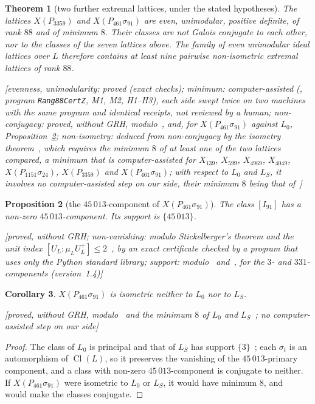 \documentclass[11pt,a4paper]{amsart}
\theoremstyle{plain}
\newtheorem{theorem}{Theorem}[section]
\newtheorem{proposition}[theorem]{Proposition}
\newtheorem{corollary}[theorem]{Corollary}
\theoremstyle{definition}
\DeclareMathOperator{\Cl}{Cl}
\newcommand{\Lz}{L_{0}}
\newcommand{\LS}{L_{S}}
\newcommand{\XA}{X(P_{3359})}
\newcommand{\XB}{X(P_{461}\sigma_{91})}
\newcommand{\XC}{X(P_{1151}\sigma_{24})}
\newcommand{\st}[1]{\textup{\textsf{\small[#1]}}}
\begin{document}
\begin{theorem}[two further extremal lattices, under the stated hypotheses]\label{thm:neuf}
The lattices $\XA$ and $\XB$ are even, unimodular, positive definite, of rank $88$ and of minimum $8$. Their classes are not Galois conjugate to each other, nor to the classes of the seven lattices above. The family of even unimodular ideal lattices over $L$ therefore contains at least nine pairwise non-isometric extremal lattices of rank $88$.

\st{evenness, unimodularity: proved (exact checks); minimum: computer-assisted (\cite[Thm.~4.6]{Gau26}, program \texttt{Rang88CertZ}, M1, M2, H1--H3), each side swept twice on two machines with the same program and identical receipts, not reviewed by a human; non-conjugacy: proved, without GRH, modulo~\cite[Prop.~2.2, 2.5]{Gau26}, \cite[Prop.~4.7]{Gau26a} and, for $\XB$ against $\Lz$, Proposition~\ref{prop:45013}; non-isometry: deduced from non-conjugacy by the isometry theorem~\cite[Thm.~3.3]{Gau26}, which requires the minimum $8$ of at least one of the two lattices compared, a minimum that is computer-assisted for $X_{139}$, $X_{599}$, $X_{4969}$, $X_{4049}$, $\XC$, $\XA$ and $\XB$; with respect to $\Lz$ and $\LS$, it involves no computer-assisted step on our side, their minimum $8$ being that of~\cite{Sak26}}
\end{theorem}

\begin{proposition}[the $45\,013$-component of $\XB$]\label{prop:45013}
The class $[I_{91}]$ has a non-zero $45\,013$-component. Its support is $\{45\,013\}$.

\st{proved, without GRH; non-vanishing: modulo Stickelberger's theorem and the unit index $[U_L:\mu_LU_L^+]\le2$~\cite[Thm.~6.10, 4.12]{Was97}, by an exact certificate checked by a program that uses only the Python standard library; support: modulo~\cite[Prop.~2.2, 2.5]{Gau26} and~\cite[Prop.~4.7]{Gau26a}, for the $3$- and $331$-components (version~1.4)}
\end{proposition}

\begin{corollary}\label{cor:L0}
$\XB$ is isometric neither to $\Lz$ nor to $\LS$.

\st{proved, without GRH, modulo~\cite[Thm.~3.3]{Gau26} and the minimum $8$ of $\Lz$ and $\LS$~\cite{Sak26}; no computer-assisted step on our side}
\end{corollary}

\begin{proof}
The class of $\Lz$ is principal and that of $\LS$ has support $\{3\}$~\cite[Prop.~2.7]{Gau26}; each $\sigma_t$ is an automorphism of $\Cl(L)$, so it preserves the vanishing of the $45\,013$-primary component, and a class with non-zero $45\,013$-component is conjugate to neither. If $\XB$ were isometric to $\Lz$ or $\LS$, it would have minimum $8$, and~\cite[Thm.~3.3]{Gau26} would make the classes conjugate.
\end{proof}
\end{document}
